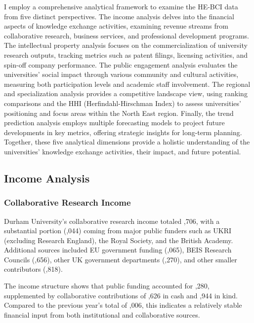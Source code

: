 \documentclass[journal,onecolumn, 10pt,draftclsnofoot]{IEEEtran}
\begin{document}
I employ a comprehensive analytical framework to examine the HE-BCI data from five distinct perspectives. The income analysis delves into the financial aspects of knowledge exchange activities, examining revenue streams from collaborative research, business services, and professional development programs. The intellectual property analysis focuses on the commercialization of university research outputs, tracking metrics such as patent filings, licensing activities, and spin-off company performance. The public engagement analysis evaluates the universities' social impact through various community and cultural activities, measuring both participation levels and academic staff involvement. The regional and specialization analysis provides a competitive landscape view, using ranking comparisons and the HHI (Herfindahl-Hirschman Index) to assess universities' positioning and focus areas within the North East region. Finally, the trend prediction analysis employs multiple forecasting models to project future developments in key metrics, offering strategic insights for long-term planning. Together, these five analytical dimensions provide a holistic understanding of the universities' knowledge exchange activities, their impact, and future potential.

\subsection{Income Analysis}

\subsubsection{Collaborative Research Income}

Durham University's collaborative research income totaled ,706, with a substantial portion (,044) coming from major public funders such as UKRI (excluding Research England), the Royal Society, and the British Academy. Additional sources included EU government funding (,065), BEIS Research Councils (,656), other UK government departments (,270), and other smaller contributors (,818).

The income structure shows that public funding accounted for ,280, supplemented by collaborative contributions of ,626 in cash and ,944 in kind. Compared to the previous year's total of ,006, this indicates a relatively stable financial input from both institutional and collaborative sources.
\end{document}
